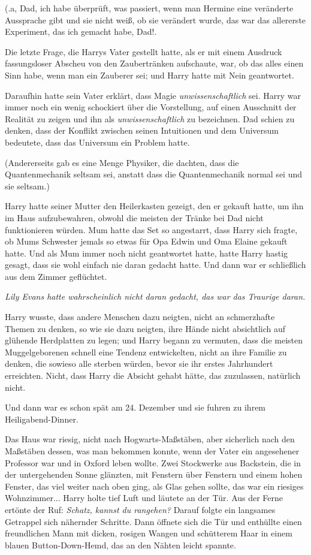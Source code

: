 (\grqq{}.a, Dad, ich habe überprüft, was passiert, wenn man Hermine eine
veränderte Aussprache gibt und sie nicht weiß, ob sie verändert wurde, das war
das allererste Experiment, das ich gemacht habe, Dad!\grqq{}.

Die letzte Frage, die Harrys Vater gestellt hatte, als er mit einem Ausdruck
fassungsloser Abscheu von den Zaubertränken aufschaute, war, ob das alles einen
Sinn habe, wenn man ein Zauberer sei; und Harry hatte mit Nein geantwortet.

Daraufhin hatte sein Vater erklärt, dass Magie \emph{unwissenschaftlich} sei.
Harry war immer noch ein wenig schockiert über die Vorstellung, auf einen
Ausschnitt der Realität zu zeigen und ihn als \emph{unwissenschaftlich} zu
bezeichnen. Dad schien zu denken, dass der Konflikt zwischen seinen Intuitionen
und dem Universum bedeutete, dass das Universum ein Problem hatte.

(Andererseits gab es eine Menge Physiker, die dachten, dass die Quantenmechanik
seltsam sei, anstatt dass die Quantenmechanik normal sei und sie seltsam.)

Harry hatte seiner Mutter den Heilerkasten gezeigt, den er gekauft hatte, um ihn
im Haus aufzubewahren, obwohl die meisten der Tränke bei Dad nicht funktionieren
würden. Mum hatte das Set so angestarrt, dass Harry sich fragte, ob Mums
Schwester jemals so etwas für Opa Edwin und Oma Elaine gekauft hatte. Und als
Mum immer noch nicht geantwortet hatte, hatte Harry hastig gesagt, dass sie wohl
einfach nie daran gedacht hatte. Und dann war er schließlich aus dem Zimmer
geflüchtet.

\emph{Lily Evans hatte wahrscheinlich nicht daran gedacht, das war das Traurige
daran.}

Harry wusste, dass andere Menschen dazu neigten, nicht an schmerzhafte Themen zu
denken, so wie sie dazu neigten, ihre Hände nicht absichtlich auf glühende
Herdplatten zu legen; und Harry begann zu vermuten, dass die meisten
Muggelgeborenen schnell eine Tendenz entwickelten, nicht an ihre Familie zu
denken, die sowieso alle sterben würden, bevor sie ihr erstes Jahrhundert
erreichten. Nicht, dass Harry die Absicht gehabt hätte, das zuzulassen,
natürlich nicht.

Und dann war es schon spät am 24. Dezember und sie fuhren zu ihrem
Heiligabend-Dinner.

Das Haus war riesig, nicht nach Hogwarts-Maßstäben, aber sicherlich nach den
Maßstäben dessen, was man bekommen konnte, wenn der Vater ein angesehener
Professor war und in Oxford leben wollte. Zwei Stockwerke aus Backstein, die in
der untergehenden Sonne glänzten, mit Fenstern über Fenstern und einem hohen
Fenster, das viel weiter nach oben ging, als Glas gehen sollte, das war ein
riesiges Wohnzimmer... Harry holte tief Luft und läutete an der Tür. Aus der
Ferne ertönte der Ruf: \glqq{}\emph{Schatz, kannst du rangehen?}\grqq{} Darauf
folgte ein langsames Getrappel sich nähernder Schritte. Dann öffnete sich die
Tür und enthüllte einen freundlichen Mann mit dicken, rosigen Wangen und
schütterem Haar in einem blauen Button-Down-Hemd, das an den Nähten leicht
spannte.

